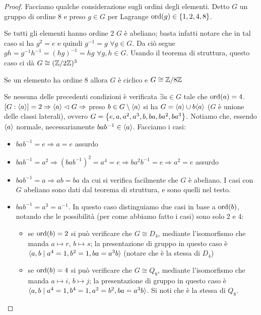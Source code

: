 \begin{proof}
    Facciamo qualche considerazione sugli ordini degli elementi. Detto $G$ un gruppo di ordine 8 e preso $g \in G$ per Lagrange $\text{ord}(g) \in \left\{ 1,2,4,8 \right\}$. 
    
    Se tutti gli elementi hanno ordine 2 $G$ è abeliano; basta infatti notare che in tal caso si ha $g^2 = e$ e quindi $g^{-1} = g$ $\forall g \in G$. Da ciò segue $gh = g^{-1}h^{-1} = (hg)^{-1} = hg$ $\forall g,h\in G$. Usando il teorema di struttura, questo caso ci dà $G \cong (\mathbb{Z}/2\mathbb{Z})^3$
    
    Se un elemento ha ordine 8 allora $G$ è ciclico e $G \cong \mathbb{Z}/8\mathbb{Z}$

    Se nessuna delle precedenti condizioni è verificata $\exists a \in G$ tale che $\text{ord}(a) = 4$. $[G : \langle a \rangle] = 2 \Rightarrow \langle a \rangle \vartriangleleft G \Rightarrow$ preso $b \in G \setminus \langle a \rangle$ si ha $G = \langle a \rangle \cup b\langle a \rangle$ ($G$ è unione delle classi laterali), ovvero $G = \left\{ e,a,a^2,a^3,b,ba,ba^2,ba^3 \right\}$. Notiamo che, essendo $\langle a \rangle$ normale, necessariamente $bab^{-1} \in \langle a \rangle$. Facciamo i casi:
    \begin{itemize}
        \item $bab^{-1} = e \Rightarrow a =e$ assurdo
        \item $bab^{-1} = a^2 \Rightarrow (bab^{-1})^2 = a^4 = e \Rightarrow ba^2b^{-1} = e \Rightarrow a^2 = e$ assurdo
        \item $bab^{-1} = a \Rightarrow ab = ba$ da cui si verifica facilmente che $G$ è abeliano. I casi con $G$ abeliano sono dati dal teorema di struttura, e sono quelli nel testo. 
        \item $bab^{-1} = a^3 = a^{-1}$. In questo caso distinguiamo due casi in base a $\text{ord}(b)$, notando che le possibilità (per come abbiamo fatto i casi) sono solo 2 e 4:
        \begin{itemize}
            \item se $\text{ord}(b) = 2$ si può verificare che $G \cong D_4$, mediante l'isomorfismo che manda $a \mapsto r$, $b \mapsto s$; la presentazione di gruppo in questo caso è $\langle a,b \mid a^4 = 1, b^2= 1, ba = a^3b \rangle$ (notare che è la stessa di $D_4$)
            \item se $\text{ord}(b) = 4$ si può verificare che $G \cong Q_8$, mediante l'isomorfismo che manda $a \mapsto i$, $b \mapsto j$; la presentazione di gruppo in questo caso è $\langle a,b \mid a^4 = 1, b^4= 1, a^2=b^2, ba = a^3b \rangle$. Si noti che è la stessa di $Q_8$.
        \end{itemize}
    \end{itemize}
\end{proof}
